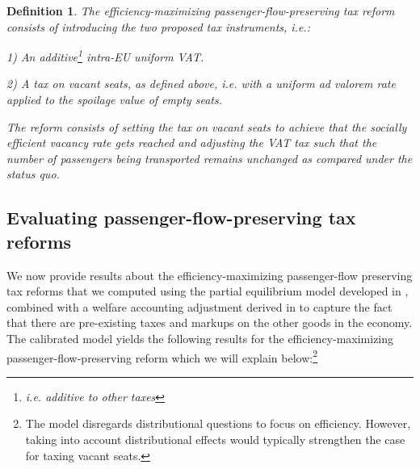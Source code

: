 \documentclass{article}
\newtheorem{definition}{Definition}
\begin{document}
\begin{definition}
    The efficiency-maximizing passenger-flow-preserving tax reform consists of introducing the two proposed tax instruments, i.e.:
    
    1) An additive\footnote{i.e. additive to other taxes} intra-EU uniform VAT.
    
    2) A tax on vacant seats, as defined above, i.e. with a uniform ad valorem rate applied to the spoilage value of empty seats. 

    The reform consists of setting the tax on vacant seats to achieve that the socially efficient vacancy rate gets reached and adjusting the VAT tax such that the number of passengers being transported remains unchanged as compared under the status quo.
\end{definition}

\subsection{Evaluating passenger-flow-preserving tax reforms}

We now provide results about the efficiency-maximizing passenger-flow preserving tax reforms that we computed using the partial equilibrium model developed in  \citet{Dörpinghaus_et_al_2026}, combined with a welfare accounting adjustment derived in \citet{stern2026wedges} to capture the fact that there are pre-existing taxes and markups on the other goods in the economy. The calibrated model yields the following results for the efficiency-maximizing passenger-flow-preserving  reform which we will explain below:\footnote{The model disregards distributional questions to focus on efficiency. However, taking into account distributional effects would typically strengthen the case for taxing vacant seats.}
\end{document}
